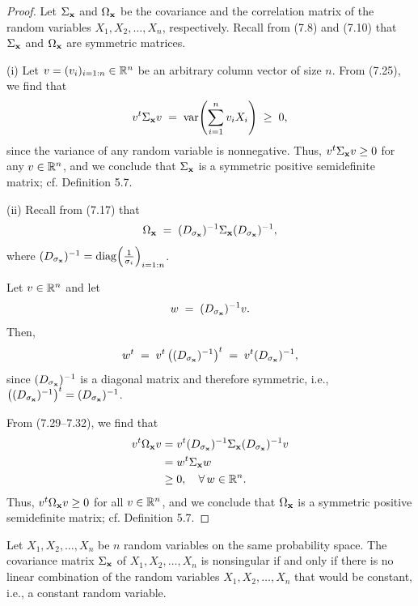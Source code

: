 \begin{proof}
Let $\Sigma_{\mathbf{x}}$ and $\Omega_{\mathbf{x}}$ be the covariance and the correlation matrix
of the random variables $X_1, X_2, \ldots, X_n$, respectively. Recall from (7.8) and
(7.10) that $\Sigma_{\mathbf{x}}$ and $\Omega_{\mathbf{x}}$ are symmetric matrices.

(i) Let $v = (v_i)_{i=1:n} \in \mathbb{R}^n$ be an arbitrary column vector of size $n$. From
(7.25), we find that
\begin{equation}
v^t\Sigma_{\mathbf{x}}v \;=\; \operatorname{var}\!\left(\sum_{i=1}^n v_iX_i\right) \;\ge\; 0,
\end{equation}
since the variance of any random variable is nonnegative. Thus, $v^t\Sigma_{\mathbf{x}}v
\ge 0$ for any $v \in \mathbb{R}^n$, and we conclude that $\Sigma_{\mathbf{x}}$ is a symmetric
positive semidefinite matrix; cf. Definition 5.7.

(ii) Recall from (7.17) that
\begin{equation}
\Omega_{\mathbf{x}} \;=\; (D_{\sigma_{\mathbf{x}}})^{-1}\Sigma_{\mathbf{x}}(D_{\sigma_{\mathbf{x}}})^{-1},
\end{equation}
where $(D_{\sigma_{\mathbf{x}}})^{-1} = \operatorname{diag}\!\left(\frac{1}{\sigma_i}\right)_{i=1:n}$.

Let $v \in \mathbb{R}^n$ and let
\begin{equation}
w \;=\; (D_{\sigma_{\mathbf{x}}})^{-1}v.
\end{equation}
Then,
\begin{equation}
w^t \;=\; v^t\left((D_{\sigma_{\mathbf{x}}})^{-1}\right)^t \;=\; v^t(D_{\sigma_{\mathbf{x}}})^{-1},
\end{equation}
since $(D_{\sigma_{\mathbf{x}}})^{-1}$ is a diagonal matrix and therefore symmetric, i.e.,
$\left((D_{\sigma_{\mathbf{x}}})^{-1}\right)^t = (D_{\sigma_{\mathbf{x}}})^{-1}$.

From (7.29--7.32), we find that
\begin{align*}
v^t\Omega_{\mathbf{x}}v &= v^t(D_{\sigma_{\mathbf{x}}})^{-1}\Sigma_{\mathbf{x}}(D_{\sigma_{\mathbf{x}}})^{-1}v \\
&= w^t\Sigma_{\mathbf{x}}w \\
&\ge 0, \quad \forall\, w \in \mathbb{R}^n.
\end{align*}
Thus, $v^t\Omega_{\mathbf{x}}v \ge 0$ for all $v \in \mathbb{R}^n$, and we conclude that
$\Omega_{\mathbf{x}}$ is a symmetric positive semidefinite matrix; cf. Definition 5.7.
\end{proof}

\begin{lemma}
Let $X_1, X_2, \ldots, X_n$ be $n$ random variables on the same probability space.
The covariance matrix $\Sigma_{\mathbf{x}}$ of $X_1, X_2, \ldots, X_n$ is nonsingular if
and only if there is no linear combination of the random variables $X_1, X_2,
\ldots, X_n$ that would be constant, i.e., a constant random variable.
\end{lemma}

